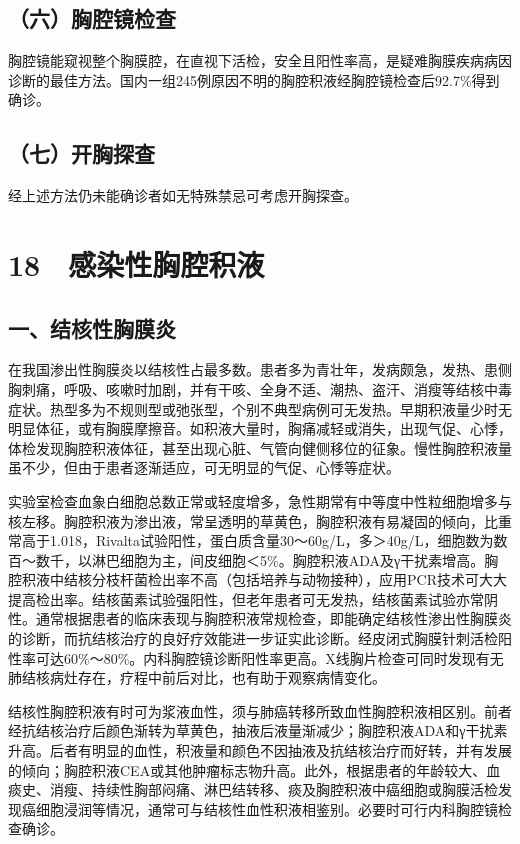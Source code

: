 \subsection{（六）胸腔镜检查}

胸腔镜能窥视整个胸膜腔，在直视下活检，安全且阳性率高，是疑难胸膜疾病病因诊断的最佳方法。国内一组245例原因不明的胸腔积液经胸腔镜检查后92.7\%得到确诊。

\subsection{（七）开胸探查}

经上述方法仍未能确诊者如无特殊禁忌可考虑开胸探查。

\protect\hypertarget{text00070.html}{}{}

\section{18　感染性胸腔积液}

\subsection{一、结核性胸膜炎}

在我国渗出性胸膜炎以结核性占最多数。患者多为青壮年，发病颇急，发热、患侧胸刺痛，呼吸、咳嗽时加剧，并有干咳、全身不适、潮热、盗汗、消瘦等结核中毒症状。热型多为不规则型或弛张型，个别不典型病例可无发热。早期积液量少时无明显体征，或有胸膜摩擦音。如积液大量时，胸痛减轻或消失，出现气促、心悸，体检发现胸腔积液体征，甚至出现心脏、气管向健侧移位的征象。慢性胸腔积液量虽不少，但由于患者逐渐适应，可无明显的气促、心悸等症状。

实验室检查血象白细胞总数正常或轻度增多，急性期常有中等度中性粒细胞增多与核左移。胸腔积液为渗出液，常呈透明的草黄色，胸腔积液有易凝固的倾向，比重常高于1.018，Rivalta试验阳性，蛋白质含量30～60g/L，多＞40g/L，细胞数为数百～数千，以淋巴细胞为主，间皮细胞＜5\%。胸腔积液ADA及γ干扰素增高。胸腔积液中结核分枝杆菌检出率不高（包括培养与动物接种），应用PCR技术可大大提高检出率。结核菌素试验强阳性，但老年患者可无发热，结核菌素试验亦常阴性。通常根据患者的临床表现与胸腔积液常规检查，即能确定结核性渗出性胸膜炎的诊断，而抗结核治疗的良好疗效能进一步证实此诊断。经皮闭式胸膜针刺活检阳性率可达60\%～80\%。内科胸腔镜诊断阳性率更高。X线胸片检查可同时发现有无肺结核病灶存在，疗程中前后对比，也有助于观察病情变化。

结核性胸腔积液有时可为浆液血性，须与肺癌转移所致血性胸腔积液相区别。前者经抗结核治疗后颜色渐转为草黄色，抽液后液量渐减少；胸腔积液ADA和γ干扰素升高。后者有明显的血性，积液量和颜色不因抽液及抗结核治疗而好转，并有发展的倾向；胸腔积液CEA或其他肿瘤标志物升高。此外，根据患者的年龄较大、血痰史、消瘦、持续性胸部闷痛、淋巴结转移、痰及胸腔积液中癌细胞或胸膜活检发现癌细胞浸润等情况，通常可与结核性血性积液相鉴别。必要时可行内科胸腔镜检查确诊。

